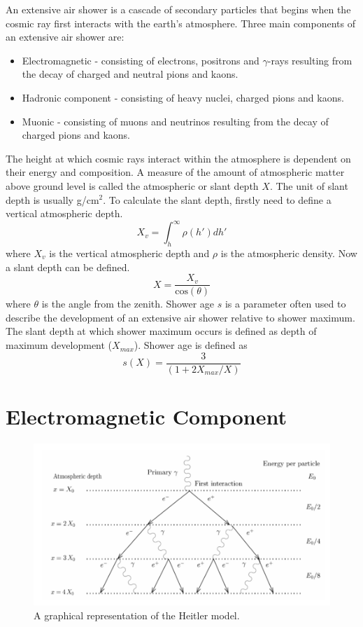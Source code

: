An extensive air shower is a cascade of secondary particles that begins when the cosmic ray
first interacts with the earth’s atmosphere. Three main components of an extensive air shower are:

\begin{itemize}
\item Electromagnetic - consisting of electrons, positrons and $\gamma$-rays resulting from the decay of charged and neutral pions and kaons.
\item Hadronic component - consisting of heavy nuclei, charged pions and kaons.
\item Muonic - consisting of muons and neutrinos resulting from the decay of charged pions and kaons.
\end{itemize}

The height at which cosmic rays interact within the atmosphere is dependent on their energy and composition. A measure of the amount of atmospheric matter above ground level is called the atmospheric or slant depth $X$. The unit of slant depth is usually g/cm$^2$. To calculate the slant depth, firstly need to define a vertical atmospheric depth.
\begin{equation}
X_v = \int^{\infty}_{h} \rho(h') dh'
\end{equation}
where $X_v$ is the vertical atmospheric depth and $\rho$ is the atmospheric density. Now a slant depth can be defined.  
\begin{equation}
X = \frac{X_v}{\mathrm{cos}(\theta)}
\end{equation}
where $\theta$ is the angle from the zenith. Shower age $s$ is a parameter often used to describe the development of an extensive air shower relative to shower maximum. The slant depth at which shower maximum occurs is defined as depth of maximum development ($X_{max}$). Shower age is defined as
\begin{equation}
s(X) = \frac{3}{(1 + 2 X_{max} / X)}
\end{equation}

\section{Electromagnetic Component}

\begin{figure}[htp]
\includegraphics[width=\textwidth]{chapters/pictures/heilter_model_EM.png}
\caption{A graphical representation of the Heitler model.}\label{fig:heitler_model}
\end{figure}


